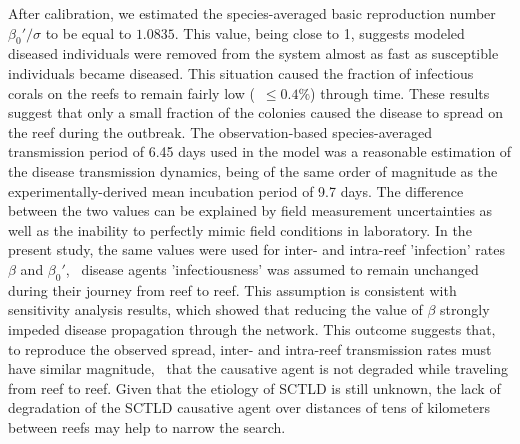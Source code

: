 After calibration, we estimated the species-averaged basic reproduction number $\beta_0'/\sigma$ to be equal to $1.0835$. This value, being close to 1, suggests modeled diseased individuals were removed from the system almost as fast as susceptible individuals became diseased. This situation caused the fraction of infectious corals on the reefs to remain fairly low (\ie~$\leq 0.4\%$) through time. These results suggest that only a small fraction of the colonies caused the disease to spread on the reef during the outbreak. The observation-based species-averaged transmission period of 6.45 days used in the model was a reasonable estimation of the disease transmission dynamics, being of the same order of magnitude as the experimentally-derived mean incubation period of 9.7 days. The difference between the two values can be explained by field measurement uncertainties as well as the inability to perfectly mimic field conditions in laboratory. In the present study, the same values were used for inter- and intra-reef 'infection' rates $\beta$ and $\beta_0'$, \ie~disease agents 'infectiousness' was assumed to remain unchanged during their journey from reef to reef. This assumption is consistent with sensitivity analysis results, which showed that reducing the value of $\beta$ strongly impeded disease propagation through the network. This outcome suggests that, to reproduce the observed spread, inter- and intra-reef transmission rates must have similar magnitude, \ie~that the causative agent is not degraded while traveling from reef to reef. Given that the etiology of SCTLD is still unknown, the lack of degradation of the SCTLD causative agent over distances of tens of kilometers between reefs may help to narrow the search.


